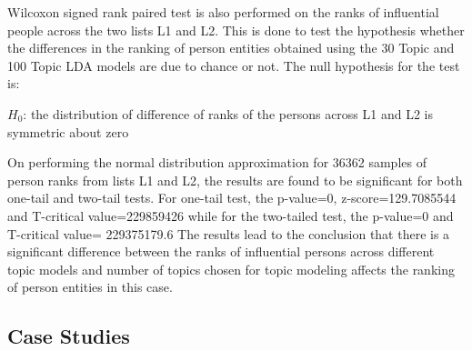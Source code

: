 Wilcoxon signed rank paired test is also performed on the ranks of influential people across the two lists L1 and L2. This is done to test the hypothesis whether the differences in the ranking of person entities obtained using the 30 Topic and 100 Topic LDA models are due to chance or not. The null hypothesis for the test is: 

$H_0$: the distribution of difference of ranks of the persons across L1 and L2 is symmetric about zero

On performing the normal distribution approximation for 36362 samples of person ranks from lists L1 and L2, the results are found to be significant for both one-tail and two-tail tests.
For one-tail test, the p-value=0, z-score=129.7085544 and T-critical value=229859426 while for the two-tailed test, the p-value=0 and T-critical value= 229375179.6
The results lead to the conclusion that there is a significant difference between the ranks of influential persons across different topic models and number of topics chosen for topic modeling affects the ranking of person entities in this case.


  \subsection{Case Studies}

